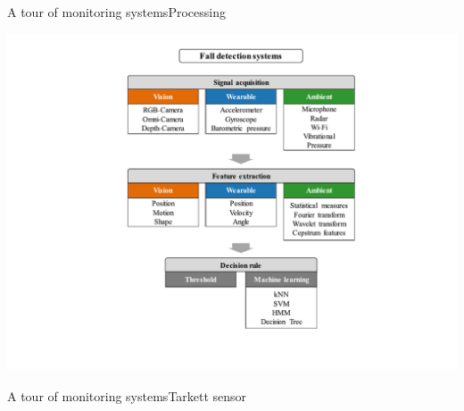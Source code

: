 \documentclass[9pt,t,aspectratio=1610]{beamer}
\begin{document}
\begin{frame}{A tour of monitoring systems}{Processing}
\begin{minipage}[t]{0.49\linewidth}
\begin{overprint}
            \includegraphics[width=\linewidth, trim={190 50 150 60}, clip]{fall_systems_3-14.pdf}
        \end{overprint}
    \end{minipage}
\end{frame}

\begin{frame}{A tour of monitoring systems}{Tarkett sensor}
\end{frame}
\end{document}
